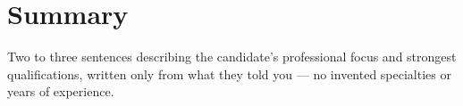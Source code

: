     \vspace{-0.3 cm}
    \section{Summary}

    \begin{onecolentry}
Two to three sentences describing the candidate's professional focus and strongest qualifications, written only from what they told you — no invented specialties or years of experience.
    \end{onecolentry}

    \vspace{-0.2 cm}
